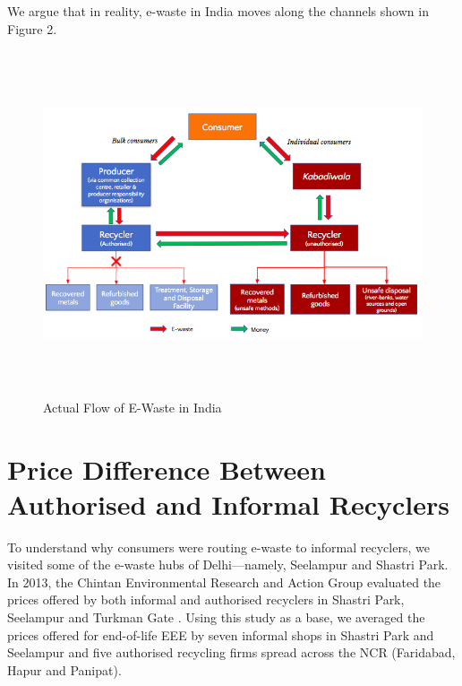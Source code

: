 \documentclass[a4paper, 12pt]{article}
\begin{document}
                    We argue that in reality, e-waste in India moves along the channels shown in Figure 2. \\
                    
\begin{figure}[H]
\centering
\includegraphics[height = 4in]{fig2.png}
\caption[Optional Caption]{Actual Flow of E-Waste in India}
\end{figure}
                    
\section{Price Difference Between Authorised and Informal Recyclers}\label{sec:3}
                    
                    To understand why consumers were routing e-waste to informal recyclers, we visited some of the e-waste hubs of Delhi—namely, Seelampur and Shastri Park.\\
                     
                     In 2013, the Chintan Environmental Research and Action Group evaluated the prices offered by both informal and authorised recyclers in Shastri Park, Seelampur and Turkman Gate \parencite{chintanreport}. Using this study as a base, we averaged the prices offered for end-of-life EEE by seven informal shops in Shastri Park and Seelampur and five authorised recycling firms spread across the NCR (Faridabad, Hapur and Panipat).\\
                     
\end{document}
